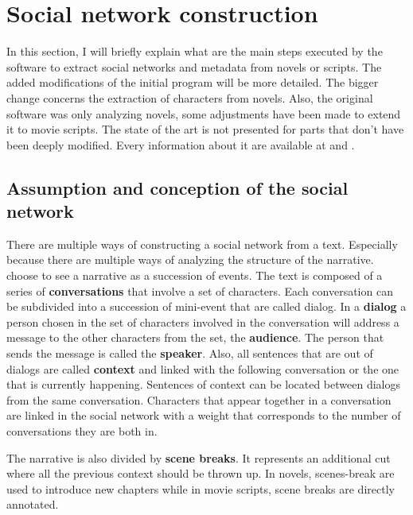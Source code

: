 \documentclass[a4paper, 12pt]{report}
\begin{document}
\chapter{Social network construction}

In this section, I will briefly explain what are the main steps executed by the software to extract social networks and metadata from novels or scripts. The added modifications of the initial program will be more detailed. The bigger change concerns the extraction of characters from novels. Also, the original software was only analyzing novels, some adjustments have been made to extend it to movie scripts. The state of the art is not presented for parts that don't have been deeply modified. Every information about it are available at \cite{original} and \cite{original_thesis}.

\section{Assumption and conception of the social network}
There are multiple ways of constructing a social network from a text. Especially because there are multiple ways of analyzing the structure of the narrative. \cite{original} choose to see a narrative as a succession of events. The text is composed of a series of \textbf{conversations} that involve a set of characters. Each conversation can be subdivided into a succession of mini-event that are called dialog. In a \textbf{dialog} a person chosen in the set of characters involved in the conversation will address a message to the other characters from the set, the \textbf{audience}. The person that sends the message is called the \textbf{speaker}. Also, all sentences that are out of dialogs are called \textbf{context} and linked with the following conversation or the one that is currently happening. Sentences of context can be located between dialogs from the same conversation. Characters that appear together in a conversation are linked in the social network with a weight that corresponds to the number of conversations they are both in.

The narrative is also divided by \textbf{scene breaks}. It represents an additional cut where all the previous context should be thrown up. In novels, scenes-break are used to introduce new chapters while in movie scripts, scene breaks are directly annotated.
\end{document}
